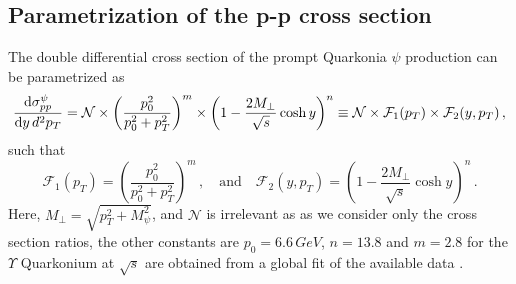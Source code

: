 \documentclass[11pt,onecolumn]{article}
\newcommand{\dd}{{\rm d}}
\newcommand{\beq}{\begin{equation}}
\newcommand{\eeq}{\end{equation}}
\begin{document}
\subsection{Parametrization of the p-p cross section}
The double differential cross section of the prompt Quarkonia $\psi$ production can be parametrized as
%
\beq
\frac{\dd \sigma^{\psi}_{pp}}{\dd y \, d^2 p_T} = \mathcal{N} \times \left( \frac{p_0^2}{p_0^2 + p_T^2} \right)^m \times \left( 1- \frac{2M_\perp}{\sqrt{s}} \cosh y \right)^n \equiv \mathcal{N} \times \mathcal{F}_1(p_T) \times \mathcal{F}_2(y,p_T) \, ,
\label{eq:pp_cs}
\eeq
%
such that
%
\beq
 \mathcal{F}_1(p_T) = \left( \frac{p_0^2}{p_0^2 + p_T^2} \right)^m \, , \quad \text{and}
 \quad \mathcal{F}_2(y,p_T) = \left( 1- \frac{2M_\perp}{\sqrt{s}} \cosh y \right)^n \, .
\eeq
%
Here, $M_\perp = \sqrt{{p}_T^2 + M_\psi^2}$, and $\mathcal{N}$ is irrelevant as as we consider only the cross section ratios, the other constants are $p_0 = 6.6 \, GeV$, $ n = 13.8 $ and $m = 2.8$ for the $\Upsilon$ Quarkonium at $\sqrt{s}$ are obtained from a global fit of the available data \cite{Arleo:2013zua}. 
\end{document}
